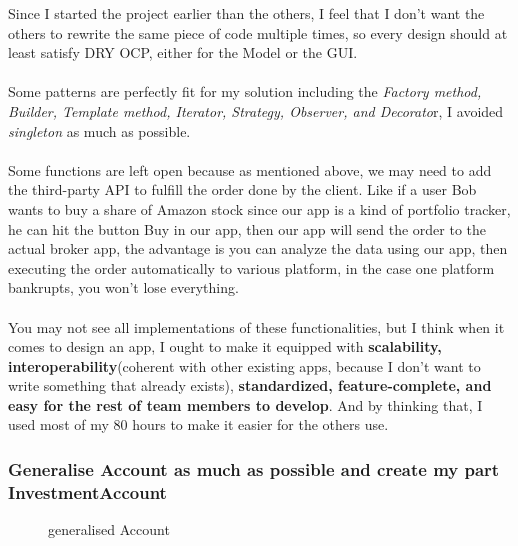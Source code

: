 \documentclass[a4paper,12pt]{report}
\begin{document}
Since I started the project earlier than the others, I feel that I don't want the others to rewrite the same piece of code multiple times, so every design should at least satisfy DRY OCP, either for the Model or the GUI.
%
\\\\Some patterns are perfectly fit for my solution including the \textit{Factory method, Builder, Template method, Iterator, Strategy, Observer, and Decorato}r, I avoided \textit{singleton} as much as possible.
%
\\\\Some functions are left open because as mentioned above, we may need to add the third-party API to fulfill the order done by the client. Like if a user Bob wants to buy a share of Amazon stock since our app is a kind of portfolio tracker,  
he can hit the button Buy in our app, then our app will send the order to the actual broker app, the advantage is you can analyze the data using our app, then executing the order automatically to various platform, in the case one platform bankrupts, you won't lose everything.
%
\\\\You may not see all implementations of these functionalities, but I think when it comes to design an app, I ought to make it equipped with  \textbf{scalability,  interoperability}(coherent with other existing apps, because I don't want to write something that already exists), \textbf{standardized, feature-complete, and easy for the rest of team members to develop}.
And by thinking that, I used most of my 80 hours to make it easier for the others use.
%
\subsubsection{Generalise Account as much as possible and create my part InvestmentAccount}
\begin{figure}[H]
    \centering{}
    \caption{generalised Account}
    \label{img:invAccount}
    \end{figure}
\end{document}
